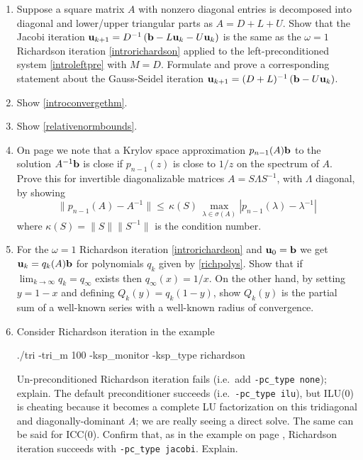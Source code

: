 \renewcommand{\labelenumi}{\arabic{chapter}.\arabic{enumi}\quad}
\begin{enumerate}
\item \label{exer:ls:jacobirichardson}  Suppose a square matrix $A$ with nonzero diagonal entries is decomposed into diagonal and lower/upper triangular parts as $A=D+L+U$.  Show that the Jacobi iteration $\mathbf{u}_{k+1} = D^{-1} \left(\mathbf{b} - L \mathbf{u}_k - U \mathbf{u}_k\right)$ is the same as the $\omega=1$ Richardson iteration \eqref{introrichardson} applied to the left-preconditioned system \eqref{introleftpre} with $M=D$.  Formulate and prove a corresponding statement about the Gauss-Seidel iteration $\mathbf{u}_{k+1} = (D+L)^{-1} \left(\mathbf{b} - U \mathbf{u}_k\right)$.
\item \label{exer:ls:showconvergethm}  Show \eqref{introconvergethm}.

\item \label{exer:ls:errornorms}  Show \eqref{relativenormbounds}.

\item On page \pageref{eq:ls:krylovgoal} we note that a Krylov space approximation $p_{n-1}(A)\mathbf{b}$ to the solution $A^{-1}\mathbf{b}$ is close if $p_{n-1}(z)$ is close to $1/z$ on the spectrum of $A$.  Prove this for invertible diagonalizable matrices $A=S\Lambda S^{-1}$, with $\Lambda$ diagonal, by showing
	$$\|p_{n-1}(A) - A^{-1}\| \le \,\kappa(S)\, \max_{\lambda \in \sigma(A)} |p_{n-1}(\lambda) - \lambda^{-1}|$$
where $\kappa(S) = \|S\| \|S^{-1}\|$ is the condition number.

\item For the $\omega=1$ Richardson iteration \eqref{introrichardson} and $\mathbf{u}_0=\mathbf{b}$ we get $\mathbf{u}_k = q_k(A) \mathbf{b}$ for polynomials $q_k$ given by \eqref{richpolys}.  Show that if $\lim_{k\to\infty} q_k=q_\infty$ exists then $q_\infty(x)=1/x$.  On the other hand, by setting $y=1-x$ and defining $Q_k(y)=q_k(1-y)$, show $Q_k(y)$ is the partial sum of a well-known series with a well-known radius of convergence.

\item Consider Richardson iteration in the example
\begin{cline}
./tri -tri_m 100 -ksp_monitor -ksp_type richardson
\end{cline}
Un-preconditioned Richardson iteration fails (i.e.~add \texttt{-pc\_type none}); explain.  The default preconditioner succeeds (i.e.~\texttt{-pc\_type ilu}), but ILU($0$) is cheating because it becomes a complete LU factorization on this tridiagonal and diagonally-dominant $A$; we are really seeing a direct solve.  The same can be said for ICC($0$).  Confirm that, as in the example on page \pageref{introprerichardson}, Richardson iteration succeeds with \texttt{-pc\_type jacobi}.  Explain.


\end{enumerate}
